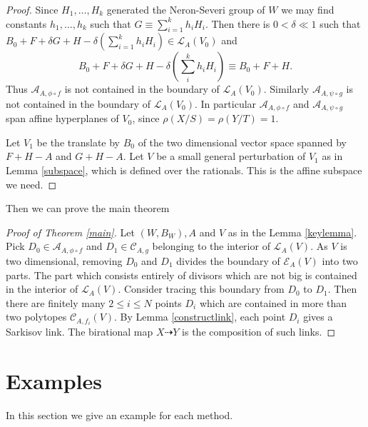 \documentclass[11pt]{amsart}
\begin{document}
\begin{proof}
Since $H_{1},\ldots ,H_{k}$ generated the Neron-Severi group of $W$ we may find constants $h_{1},\ldots ,h_{k}$ such that $G \equiv \sum^{k}_{i=1} h_{i}H_{i}$. Then there is $0< \delta\ll 1$ such that  $B_{0}+F+\delta G+H- \delta(\sum_{i=1}^{k} h_{i}H_{i}) \in \mathcal{L}_{A}(V_{0})$ and
\[
  B_{0}+F+\delta G+H-\delta (\sum_i^k h_{i}H_{i}) \equiv B_{0}+F+H
.\]
Thus $\mathcal{A}_{A,\phi\circ f}$ is not contained in the boundary of $\mathcal{L}_{A}(V_{0})$. Similarly $\mathcal{A}_{A,\psi\circ g}$ is not contained in the boundary of $\mathcal{L}_{A}(V_{0})$. In particular $\mathcal{A}_{A,\phi\circ f}$ and   $\mathcal{A}_{A,\psi\circ g}$ span affine hyperplanes of $V_{0}$, since $\rho(X/S)=\rho(Y/T)=1$.

Let $V_{1}$ be the translate by $B_{0}$ of the two dimensional vector space spanned by $F+H-A$ and $G+H-A$. Let $V$ be a small general perturbation of $V_{1}$ as in Lemma \ref{subspace}, which is defined over the rationals. This is the affine subspace we need.
\end{proof}
Then we can prove the main theorem

\begin{proof}[Proof of Theorem \ref{main}]
Let $(W,B_{W}),A $ and $V$ as in the Lemma \ref{keylemma}.  Pick $ D_{0} \in \mathcal{A}_{A,\phi\circ f} $  and $ D_1\in \mathcal{C}_{A,g} $ belonging to the interior of $ \mathcal{L}_A(V) $. As $ V $ is two dimensional, removing $ D_0 $ and $ D_1 $ divides the boundary of $ \mathcal{E}_A(V) $ into two parts. The part which consists entirely of divisors which are not big is contained in the interior of $ \mathcal{L}_A(V) $. Consider tracing this boundary from $ D_0 $ to $ D_1 $. Then there are finitely many $ 2\leqslant i\leqslant N $ points $ D_i $ which are contained in more than two polytopes $ \mathcal{C}_{A,f_i}(V) $. By Lemma \ref{constructlink},  each point $ D_i $ gives a Sarkisov link.  The birational map $X \dashrightarrow Y$ is the composition of such links.
\end{proof}

\section{Examples}
In this  section we give an example for each method.
\end{document}
